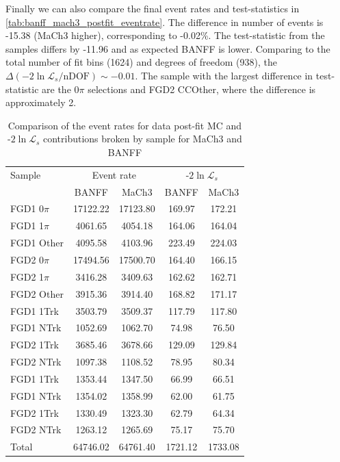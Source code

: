 Finally we can also compare the final event rates and test-statistics in \autoref{tab:banff_mach3_postfit_eventrate}. The difference in number of events is -15.38 (MaCh3 higher), corresponding to -0.02\%. The test-statistic from the samples differs by -11.96 and as expected BANFF is lower. Comparing to the total number of fit bins (1624) and degrees of freedom (938), the $\Delta\left(-2\ln\mathcal{L}_s/\text{nDOF}\right) \sim -0.01$. The sample with the largest difference in test-statistic are the 0$\pi$ selections and FGD2 CCOther, where the difference is approximately 2.
\begin{table}[h]
	\centering 
		\begin{tabular}{ l | c c | c c }
			\hline
			\hline
                        Sample 		& \multicolumn{2}{c|}{Event rate} & \multicolumn{2}{c}{-$2\ln{\mathcal{L}}_{s}$} \\
                                        & BANFF         & MaCh3    & BANFF    & MaCh3 \\
                        \hline
			FGD1 0$\pi$ 	& 17122.22 	& 17123.80 & 169.97   & 172.21 	\\ 
			FGD1 1$\pi$ 	& 4061.65 	& 4054.18  & 164.06   & 164.04 	\\ 
			FGD1 Other 	& 4095.58 	& 4103.96  & 223.49   & 224.03 	\\ 
                        \hline
			FGD2 0$\pi$ 	& 17494.56 	& 17500.70 & 164.40   & 166.15 	\\ 
			FGD2 1$\pi$ 	& 3416.28 	& 3409.63  & 162.62   & 162.71 	\\ 
			FGD2 Other 	& 3915.36 	& 3914.40  & 168.82   & 171.17 	\\ 
                        \hline
			FGD1 1Trk 	& 3503.79 	& 3509.37  & 117.79   & 117.80 	\\ 
			FGD1 NTrk 	& 1052.69 	& 1062.70  & 74.98    & 76.50 	\\ 
			FGD2 1Trk 	& 3685.46  	& 3678.66  & 129.09   & 129.84 	\\ 
			FGD2 NTrk 	& 1097.38	& 1108.52  & 78.95    & 80.34 	\\ 
                        \hline
			FGD1 1Trk 	& 1353.44 	& 1347.50  & 66.99    & 66.51 	\\ 
			FGD1 NTrk 	& 1354.02 	& 1358.99  & 62.00    & 61.75 	\\ 
			FGD2 1Trk 	& 1330.49 	& 1323.30  & 62.79    & 64.34 	\\ 
			FGD2 NTrk 	& 1263.12 	& 1265.69  & 75.17    & 75.70 	\\ 
			\hline
			Total 		& 64746.02      & 64761.40 & 1721.12  & 1733.08 	\\ 
                        \hline
                        \hline
		\end{tabular}
	\caption{Comparison of the event rates for data post-fit MC and -$2\ln{\mathcal{L}}_{s}$ contributions broken by sample for MaCh3 and BANFF}
	\label{tab:banff_mach3_postfit_eventrate}
\end{table}

